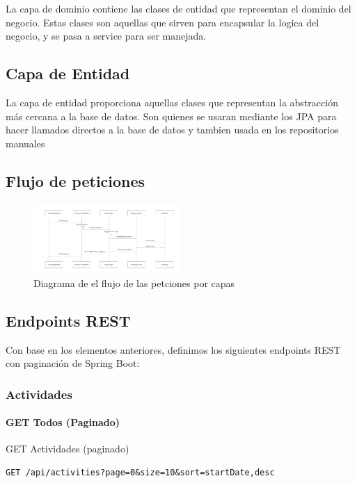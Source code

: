 \documentclass[11pt,a4paper]{article}
\begin{document}
La capa de dominio contiene las clases de entidad que representan el dominio del negocio.
Estas clases son aquellas que sirven para encapsular la logica del negocio, y se pasa a service para ser manejada.

\subsection{Capa de Entidad}
La capa de entidad proporciona aquellas clases que representan la abstracción más cercana a la base de datos.
Son quienes se usaran mediante los JPA para hacer llamados directos a la base de datos y tambien usada en los repositorios manuales

\subsection{Flujo de peticiones}
\begin{figure}[H]
	\centering
	\includegraphics[width=0.5\textwidth]{src/SID_request-flow.pdf}
	\caption{Diagrama de el flujo de las petciones por capas}
\end{figure}

\subsection{Endpoints REST}
Con base en los elementos anteriores, definimos los siguientes endpoints REST con paginación de Spring Boot:


\subsubsection{Actividades}

\paragraph{GET Todos (Paginado)}

\begin{center}
	\begin{minipage}{\textwidth}
		\begin{codebox}{GET Actividades (paginado)}
			\begin{lstlisting}[language=HTTP]
GET /api/activities?page=0&size=10&sort=startDate,desc
\end{lstlisting}
		\end{codebox}
	\end{minipage}
\end{center}
\end{document}
